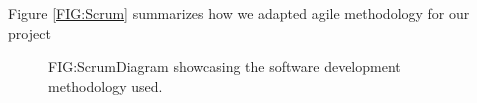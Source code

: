 Figure \ref{FIG:Scrum} summarizes how we adapted agile methodology for our project
\begin{figure}[Summary of the development process]{FIG:Scrum}{Diagram showcasing the software development methodology used.}
\end{figure}

